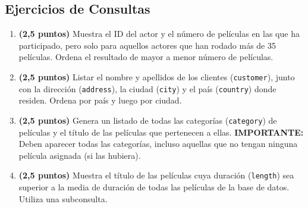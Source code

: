 \documentclass[a4paper,11pt]{article}
\begin{document}
\begin{Form}
\section{Ejercicios de Consultas}

\begin{enumerate}[leftmargin=*, label=\textbf{Consulta \arabic*:}]
    \item \textbf{(2,5 puntos)} %
    Muestra el ID del actor y el número de películas en las que ha participado, pero solo para aquellos actores que han rodado más de 35 películas. Ordena el resultado de mayor a menor número de películas.

    \item \textbf{(2,5 puntos)} %
    Listar el nombre y apellidos de los clientes (\texttt{customer}), junto con la dirección (\texttt{address}), la ciudad (\texttt{city}) y el país (\texttt{country}) donde residen. Ordena por país y luego por ciudad.

    \item \textbf{(2,5 puntos)} %
    Genera un listado de todas las categorías (\texttt{category}) de películas y el título de las películas que pertenecen a ellas. \textbf{IMPORTANTE:} Deben aparecer todas las categorías, incluso aquellas que no tengan ninguna película asignada (si las hubiera).

    \item \textbf{(2,5 puntos)} %
    Muestra el título de las películas cuya duración (\texttt{length}) sea superior a la media de duración de todas las películas de la base de datos. Utiliza una subconsulta.
\end{enumerate}

\end{Form}
\end{document}
